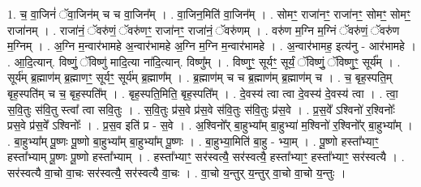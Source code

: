 \documentclass[17pt]{extarticle}
\begin{document}
1. च॒ वा॒जिनं॑ ॅवा॒जिन॑म् च च वा॒जिन᳚म् । . वा॒जिन॒मिति॑ वा॒जिन᳚म् । . सोमꣳ॒॒ राजा॑नꣳ॒॒ राजा॑नꣳ॒॒ सोमꣳ॒॒ सोमꣳ॒॒ राजा॑नम् । . राजा॑नं॒ ॅवरु॑णं॒ ॅवरु॑णꣳ॒॒ राजा॑नꣳ॒॒ राजा॑नं॒ ॅवरु॑णम् । . वरु॑ण म॒ग्नि म॒ग्निं ॅवरु॑णं॒ ॅवरु॑ण म॒ग्निम् । . अ॒ग्नि म॒न्वार॑भामहे अ॒न्वार॑भामहे अ॒ग्नि म॒ग्नि म॒न्वार॑भामहे । . अ॒न्वार॑भामह॒ इत्य॑नु - आर॑भामहे । . आ॒दि॒त्यान्. विष्णुं॒ ॅविष्णु॑ मादि॒त्या ना॑दि॒त्यान्. विष्णु᳚म् । . विष्णुꣳ॒॒ सूर्यꣳ॒॒ सूर्यं॒ ॅविष्णुं॒ ॅविष्णुꣳ॒॒ सूर्य᳚म् । . सूर्य॑म् ब्र॒ह्माण॑म् ब्र॒ह्माणꣳ॒॒ सूर्यꣳ॒॒ सूर्य॑म् ब्र॒ह्माण᳚म् । . ब्र॒ह्माण॑म् च च ब्र॒ह्माण॑म् ब्र॒ह्माण॑म् च । . च॒ बृह॒स्पति॒म् बृह॒स्पति॑म् च च॒ बृह॒स्पति᳚म् । . बृह॒स्पति॒मिति॒ बृह॒स्पति᳚म् । . दे॒वस्य॑ त्वा त्वा दे॒वस्य॑ दे॒वस्य॑ त्वा । . त्वा॒ स॒वि॒तुः स॑वि॒तु स्त्वा᳚ त्वा सवि॒तुः । . स॒वि॒तुः प्र॑स॒वे प्र॑स॒वे स॑वि॒तुः स॑वि॒तुः प्र॑स॒वे । . प्र॒स॒वे᳚ ऽश्विनो॑ र॒श्विनोः᳚ प्रस॒वे प्र॑स॒वे᳚ ऽश्विनोः᳚ । . प्र॒स॒व इति॑ प्र - स॒वे । . अ॒श्विनो᳚र् बा॒हुभ्या᳚म् बा॒हुभ्या॑ म॒श्विनो॑ र॒श्विनो᳚र् बा॒हुभ्या᳚म् । . बा॒हुभ्या᳚म् पू॒ष्णः पू॒ष्णो बा॒हुभ्या᳚म् बा॒हुभ्या᳚म् पू॒ष्णः । . बा॒हुभ्या॒मिति॑ बा॒हु - भ्या॒म् । . पू॒ष्णो हस्ता᳚भ्याꣳ॒॒ हस्ता᳚भ्याम् पू॒ष्णः पू॒ष्णो हस्ता᳚भ्याम् । . हस्ता᳚भ्याꣳ॒॒ सर॑स्वत्यै॒ सर॑स्वत्यै॒ हस्ता᳚भ्याꣳ॒॒ हस्ता᳚भ्याꣳ॒॒ सर॑स्वत्यै । . सर॑स्वत्यै वा॒चो वा॒चः सर॑स्वत्यै॒ सर॑स्वत्यै वा॒चः । . वा॒चो य॒न्तुर् य॒न्तुर् वा॒चो वा॒चो य॒न्तुः । \newline
\end{document}

